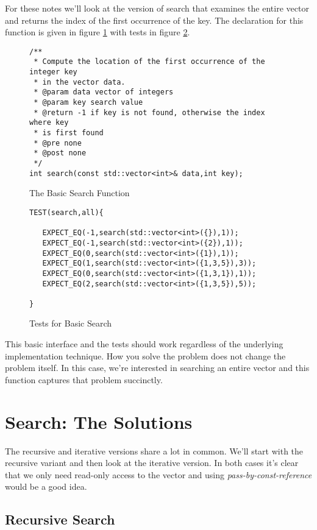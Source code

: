 \documentclass[]{tufte-handout}
\begin{document}
For these notes we'll look at the version of search that examines the entire vector and returns the index of the first occurrence
of the key. The declaration for this function is given in figure \ref{code:searchdecl} with tests in figure \ref{code:searchtests}.

\begin{figure}[!htpb]
\begin{lstlisting}
/**
 * Compute the location of the first occurrence of the integer key
 * in the vector data.
 * @param data vector of integers
 * @param key search value
 * @return -1 if key is not found, otherwise the index where key
 * is first found
 * @pre none
 * @post none
 */
int search(const std::vector<int>& data,int key);
\end{lstlisting}
\label{code:searchdecl}
\caption{The Basic Search Function}
\end{figure}

\begin{figure}[htpb!]
\begin{lstlisting}
TEST(search,all){

   EXPECT_EQ(-1,search(std::vector<int>({}),1));
   EXPECT_EQ(-1,search(std::vector<int>({2}),1));
   EXPECT_EQ(0,search(std::vector<int>({1}),1));
   EXPECT_EQ(1,search(std::vector<int>({1,3,5}),3));
   EXPECT_EQ(0,search(std::vector<int>({1,3,1}),1));
   EXPECT_EQ(2,search(std::vector<int>({1,3,5}),5));

}
\end{lstlisting}
\label{code:searchtests}
\caption{Tests for Basic Search}
\end{figure}

This basic interface and the tests should work regardless of the underlying implementation technique.  How you solve the problem does not change the problem itself.  In this case, we're interested in searching an entire vector and this function captures that problem succinctly.

\section{Search: The Solutions}

The recursive and iterative versions share a lot in common. We'll start with the recursive variant and then look at the iterative version. In both cases it's clear that we only need read-only access to the vector and using \textit{pass-by-const-reference} would be a good idea.

\subsection{Recursive Search}
\end{document}
